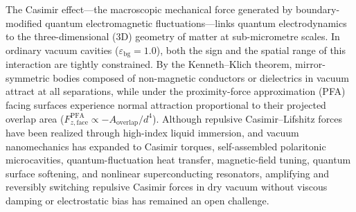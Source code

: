 \documentclass[pdflatex,sn-nature]{sn-jnl}
\begin{document}
\maketitle

The Casimir effect---the macroscopic mechanical force generated by boundary-modified quantum electromagnetic fluctuations\cite{casimir1948,casimirpolder1948,bordag2009}---links quantum electrodynamics to the three-dimensional (3D) geometry of matter at sub-micrometre scales\cite{rodriguez2011}. In ordinary vacuum cavities ($\varepsilon_{\mathrm{bg}}=1.0$), both the sign and the spatial range of this interaction are tightly constrained. By the Kenneth--Klich theorem\cite{kennethklich2006}, mirror-symmetric bodies composed of non-magnetic conductors or dielectrics in vacuum attract at all separations, while under the proximity-force approximation (PFA) facing surfaces experience normal attraction proportional to their projected overlap area ($F_{z,\mathrm{face}}^{\mathrm{PFA}} \propto -A_{\mathrm{overlap}}/d^4$). Although repulsive Casimir--Lifshitz forces have been realized through high-index liquid immersion\cite{munday2009}, and vacuum nanomechanics has expanded to Casimir torques\cite{somers2018}, self-assembled polaritonic microcavities\cite{munkhbat2021}, quantum-fluctuation heat transfer\cite{fong2019,Xu2022}, magnetic-field tuning\cite{Zhang2024}, quantum surface softening\cite{zhang2025prl}, and nonlinear superconducting resonators\cite{dejong2026}, amplifying and reversibly switching repulsive Casimir forces in dry vacuum without viscous damping or electrostatic bias has remained an open challenge\cite{rodriguez2011}.
\end{document}
